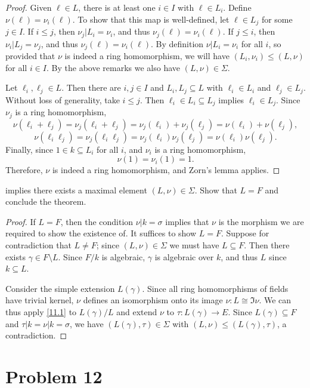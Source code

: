 \documentclass[11pt, letterpaper]{article}
\begin{document}
\begin{proof}
	Given $\ell \in L$, there is at least one $i\in I$ with $\ell \in L_i$. Define $\nu (\ell )=\nu _i(\ell )$. To show that this map is well-defined, let $\ell \in L_j$ for some $j\in I$. If $i\leq j$, then $\nu _j|L_i=\nu _i$, and thus $\nu _j(\ell )=\nu _i(\ell )$. If $j\leq i$, then $\nu _i|L_j=\nu _j$, and thus $\nu_j(\ell )=\nu _i(\ell )$. By definition $\nu |L_i=\nu _i$ for all $i$, so provided that $\nu $ is indeed a ring homomorphism, we will have $(L_i,\nu _i)\leq (L,\nu )$ for all $i\in I$. By the above remarks we also have $(L,\nu )\in \Sigma $.

	Let $\ell _i,\ell _j\in L$. Then there are $i,j\in I$ and $L_i,L_j \subseteq L$ with $\ell _i\in L_i$ and $\ell _j\in L_j$. Without loss of generality, take $i \leq j$. Then $\ell _i \in L_i \subseteq L_j$ implies $\ell _i\in L_j$. Since $\nu _j$ is a ring homomorphism,
	\[
		\nu (\ell _i+\ell _j)=\nu_j(\ell _i+\ell _j)=\nu _j(\ell _i)+\nu _j(\ell _j)=\nu (\ell _i)+\nu (\ell _j),
	\]
	\[
		\nu (\ell _i\ell _j)=\nu _j(\ell _i\ell _j)=\nu _j(\ell _i)\nu _j(\ell _j)=\nu (\ell _i)\nu (\ell _j).
	\]
	Finally, since $1\in k \subseteq L_i$ for all $i$, and $\nu _i$ is a ring homomorphism,
	\[
		\nu (1)=\nu _i(1)=1
	.\]
	Therefore, $\nu $ is indeed a ring homomorphism, and Zorn's lemma applies.
\end{proof}
\begin{problem}\label{11.3}
	 implies there exists a maximal element $(L,\nu )\in \Sigma $. Show that $L=F$ and conclude the theorem.
\end{problem}
\begin{proof}
	If $L=F$, then the condition $\nu |k=\sigma $ implies that $\nu $ is the morphism we are required to show the existence of. It suffices to show $L=F$. Suppose for contradiction that $L\neq F$; since $(L,\nu )\in \Sigma $ we must have $L\subseteq F$. Then there exists $\gamma \in F\setminus L$. Since $F/k$ is algebraic, $\gamma $ is algebraic over $k$, and thus $L$ since $k\subseteq L$.

	Consider the simple extension $L(\gamma )$. Since all ring homomorphisms of fields have trivial kernel, $\nu $ defines an isomorphism onto its image $\nu : L \cong \Im \nu $. We can thus apply \cref{11.1} to $L(\gamma ) /L$ and extend $\nu $ to $\tau : L(\gamma ) \to E$. Since $L(\gamma )\subseteq F$ and $\tau |k=\nu |k=\sigma $, we have $(L(\gamma ),\tau )\in \Sigma $ with $(L,\nu )\leq (L(\gamma ),\tau )$, a contradiction.
\end{proof}

\section{Problem 12}
\end{document}
